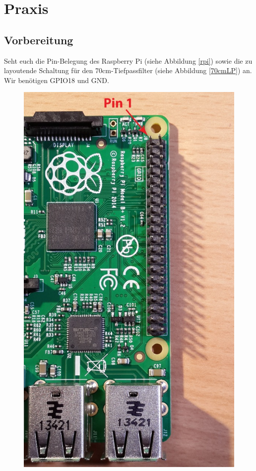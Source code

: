 \section*{Praxis}

\subsection*{Vorbereitung}

Seht euch die Pin-Belegung des Raspberry Pi (siehe Abbildung \ref{rpi}) sowie
die zu layoutende Schaltung für den 70cm-Tiefpassfilter (siehe Abbildung
\ref{70cmLP}) an. Wir benötigen GPIO18 und GND.

\begin{figure}[H]
    \centering
    \includegraphics[height=0.4\textheight]{Schwingkreis/Bilder/B_plus_hdr_sm.jpg}

\end{figure}
